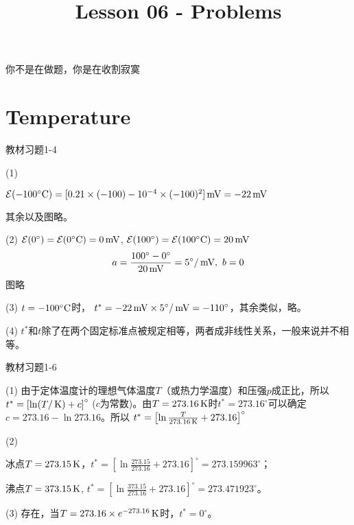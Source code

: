 \documentclass[CJK]{beamer}
\title{Lesson 06 - Problems}
\author{}
\date{}
\begin{document}

\begin{frame}
\bch


你不是在做题，你是在收割寂寞
\ech
\end{frame}


\section{Temperature}

\begin{frame}
\bch
{\blue 教材习题1-4}

{\scriptsize
\bitem
\item[(1)]{$\mathcal{E}(-100^\circ \mathrm{C}) = [0.21\times (-100) - 10^{-4}\times (-100)^2] \,\mathrm{mV} = -22 \,\mathrm{mV}$

其余以及图略。}
\item[(2)]{ $\mathcal{E}(0^\circ) =\mathcal{E}(0^\circ \mathrm{C}) = 0 \,\mathrm{mV}$, $\mathcal{E}(100^\circ) = \mathcal{E}(100^\circ \mathrm{C}) = 20 \,\mathrm{mV}$
$$a = \frac{100^\circ - 0^\circ}{20\,\mathrm{mV}} =5 ^\circ/\,\mathrm{mV},\ b = 0$$ 图略}
\item[(3)]{$t = -100^\circ \mathrm{C}$时， $t^*=-22\,\mathrm{mV} \times 5^\circ/\,\mathrm{mV} = -110^\circ$，其余类似，略。}
\item[(4)]{$t^*$和$t$除了在两个固定标准点被规定相等，两者成非线性关系，一般来说并不相等。}
\eitem
}
\ech
\end{frame}


\begin{frame}
\bch
{\blue 教材习题1-6}

{\scriptsize
\bitem
\item[(1)]{由于定体温度计的理想气体温度$T$（或热力学温度）和压强$p$成正比，所以 $t^* = \left[\ln (T/\,\mathrm{K}) + c\right]^\circ$ ($c$为常数)。由$T=273.16\,\mathrm{K}$时$t^* = 273.16^\circ$可以确定$c=273.16-\ln 273.16$。所以 $t^* = \left[\ln \frac{T}{273.16\,\mathrm{K}} + 273.16\right]^\circ$}
\item[(2)]{冰点$T = 273.15\,\mathrm{K}$，$t^* = \left[\ln \frac{273.15}{273.16}+273.16\right]^\circ = 273.159963^\circ$；

沸点$T=373.15\,\mathrm{K}$, $t^* =  \left[\ln \frac{373.15}{273.16}+273.16\right]^\circ = 273.471923^\circ$。}
\item[(3)]{存在，当$T=273.16\times e^{-273.16}\,\mathrm{K}$时，$t^* = 0^\circ$。}
\eitem
}
\ech
\end{frame}
\end{document}
